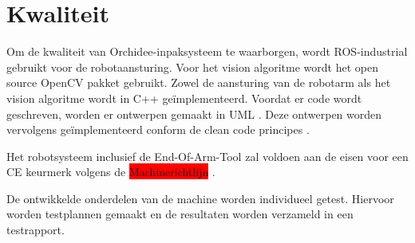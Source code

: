
\section{Kwaliteit}

Om de kwaliteit van Orchidee-inpaksysteem te waarborgen, wordt ROS-industrial gebruikt voor de robotaansturing.
Voor het vision algoritme wordt het open source OpenCV pakket gebruikt.
Zowel de aansturing van de robotarm als het vision algoritme wordt in C++ geïmplementeerd.
Voordat er code wordt geschreven, worden er ontwerpen gemaakt in UML \cite{UML}.
Deze ontwerpen worden vervolgens geïmplementeerd conform de clean code principes \cite{CLEAN_CODE}.

Het robotsysteem inclusief de End-Of-Arm-Tool zal voldoen aan de eisen voor een CE keurmerk volgens de \colorbox{red}{Machinerichtlijn} \cite{Machinerichtlijn}.

De ontwikkelde onderdelen van de machine worden individueel getest. Hiervoor worden testplannen gemaakt en de resultaten worden verzameld in een testrapport.

\newpage

